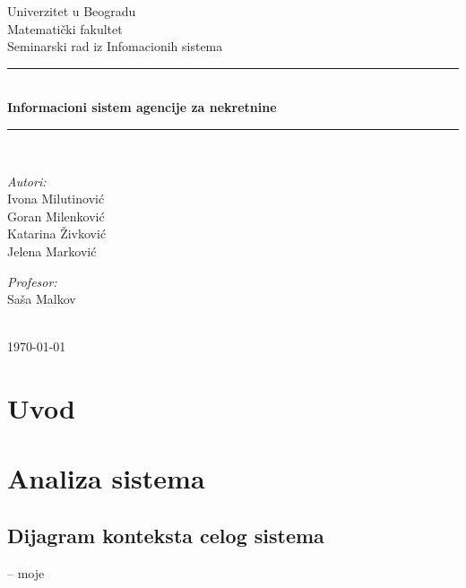 \documentclass{article}
\begin{document}
\begin{titlepage}

\newcommand{\HRule}{\rule{\linewidth}{0.5mm}}
\center
\textup{\Large Univerzitet u Beogradu\\Matemati\v{c}ki fakultet}\\[1.5cm]
\textup{\Large Seminarski rad iz Infomacionih sistema}\\[0.4cm]

\HRule \\[0.4cm]
{ \huge \bfseries Informacioni sistem agencije za nekretnine}\\[0.4cm]
\HRule \\[8.5cm]

\begin{minipage}{0.4\textwidth}
\begin{flushleft}
\large
\emph{Autori:}\\
\textup Ivona Milutinovi\' c\\
\textup Goran Milenkovi\' c\\
\textup Katarina \v Zivkovi\' c\\
\textup Jelena Markovi\' c

\end{flushleft}
\end{minipage}
\hfill
\begin{minipage}{0.4\textwidth}
\begin{flushright}
\large
\emph{Profesor:} \\
\textup Sa\v sa Malkov\\
\end{flushright}
\end{minipage}\\[2cm]


{\textup \large \today}\\[1cm]

\end{titlepage}

\newpage
\tableofcontents

\newpage
\section{\bfseries Uvod}

\newpage
\section{\bfseries Analiza sistema}

\newpage
\subsection{\bfseries Dijagram konteksta celog sistema}
-- moje
\end{document}

